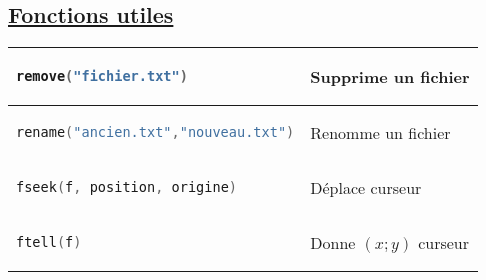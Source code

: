 \documentclass[a3paper,12pt]{article}
\begin{document}
\begin{minipage}[t]{0.5\textwidth}
\begin{tcolorbox}[title=Manipulation de fichiers, fonttitle=\large, top=5.5pt, bottom=5pt, boxsep=1pt, colback=white,
  colframe=orange!50!black!40, 
  colbacktitle=orange!50!black!40,
  coltitle=white,]
\subsection*{{\small\underline{Fonctions utiles}}}
\begin{tabular}{|l|p{4cm}|}
\hline
\begin{lstlisting}[language=C, basicstyle=\normalsize, aboveskip=0pt, belowskip=0pt,showstringspaces=false]
remove("fichier.txt")
\end{lstlisting}
& Supprime un fichier
\\[0.25em]
\hline
\begin{lstlisting}[language=C, basicstyle=\normalsize, aboveskip=0pt, belowskip=0pt,showstringspaces=false]
rename("ancien.txt","nouveau.txt")
\end{lstlisting}
& Renomme un fichier
\\[0.25em]
\hline
\begin{lstlisting}[language=C, basicstyle=\normalsize, aboveskip=0pt, belowskip=0pt,showstringspaces=false]
fseek(f, position, origine)
\end{lstlisting}
& Déplace curseur
\\[0.25em]
\hline
\begin{lstlisting}[language=C, basicstyle=\normalsize, aboveskip=0pt, belowskip=0pt,showstringspaces=false]
ftell(f)
\end{lstlisting}
& Donne $(x;y)$ curseur
\\[0.25em]
\hline
\end{tabular}
  \end{tcolorbox}
  
  
  \end{minipage}
  \hfill
\end{document}
